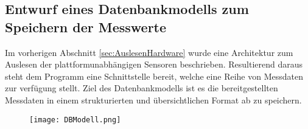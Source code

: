 \subsection{Entwurf eines Datenbankmodells zum Speichern der Messwerte}
Im vorherigen Abschnitt \ref{sec:AuslesenHardware} wurde eine Architektur zum Auslesen der plattformunabhängigen Sensoren beschrieben. Resultierend daraus steht dem Programm eine Schnittstelle bereit, welche eine Reihe von Messdaten zur verfügung stellt. Ziel des Datenbankmodells ist es die bereitgestellten Messdaten in einem strukturierten und übersichtlichen Format ab zu speichern.\\
\begin{center}
    \begin{figure}[h!]
        \centering
        \texttt{[image: DBModell.png]}
        \caption{}
        \label{fig:DBModell}
    \end{figure}
\end{center}
\vspace{-1.8cm}  
